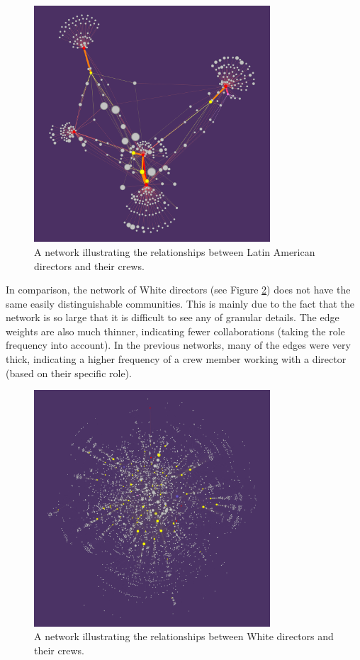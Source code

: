 \documentclass[12pt]{article}
\begin{document}
\begin{figure}[H]
    \centering
    \includegraphics[width=250pt, scale=0.5] {3_latinamerican_egonetwork.jpg}
    \caption{A network illustrating the relationships between Latin American directors and their crews.}
    \label{fig:latinAmericanEgo}
\end{figure}

\par
In comparison, the network of White directors (see Figure \ref{fig:whiteEgo}) does not have the same easily distinguishable communities. This is mainly due to the fact that the network is so large that it is difficult to see any of granular details. The edge weights are also much thinner, indicating fewer collaborations (taking the role frequency into account). In the previous networks, many of the edges were very thick, indicating a higher frequency of a crew member working with a director (based on their specific role).
\begin{figure}[H]
    \centering
    \includegraphics[width=250pt, scale=0.5] {3_white_egonetwork.jpg}
    \caption{A network illustrating the relationships between White directors and their crews.}
    \label{fig:whiteEgo}
\end{figure}
\end{document}
